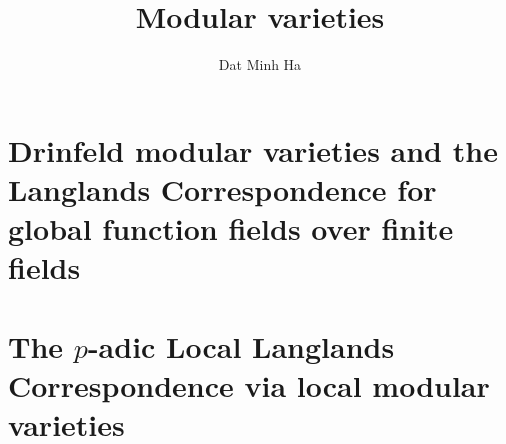 

\setcounter{section}{-1}





	\title{Modular varieties}
	
	\author{Dat Minh Ha}
	\maketitle
	
	\begin{abstract}
	    
	\end{abstract}
	
	{
      \hypersetup{} 
      \tableofcontents %
    }
    
    \part{Drinfeld modular varieties and the Langlands Correspondence for global function fields over finite fields}
        
        
    \part{The \texorpdfstring{$p$}{}-adic Local Langlands Correspondence via local modular varieties}
        
        
        
        
        
	
	\printbibliography

